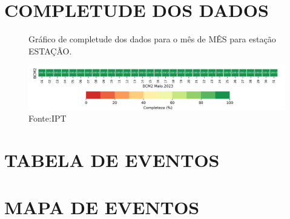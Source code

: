 \documentclass[12pt]{iptex}
\begin{document}
\newpage
\section{COMPLETUDE DOS DADOS}
\label{fig:completude}

\begin{figure}[htb!]
    \centering
	\captionsetup{justification=raggedright,
                  singlelinecheck=false,
                  width=0.4\textwidth,
                  format=plain}
    \caption{Gráfico de completude dos dados para o mês de MÊS para estação ESTAÇÃO.}
    \includegraphics[width=1.0\textwidth]{../figuras/completude.png} %
    \caption*{Fonte:IPT}
	\label{fig:logo}
\end{figure}

\section{TABELA DE EVENTOS}
\label{sec:tabelas}



\newpage

\section{MAPA DE EVENTOS}
\label{sec:mapa}





%



\end{document}
